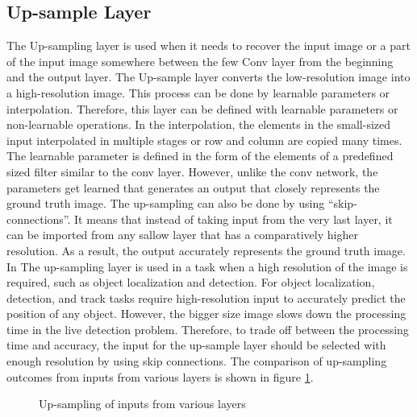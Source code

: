 \subsection{Up-sample Layer}
The Up-sampling layer is used when it needs to recover the input image or a part of the input image somewhere between the few Conv layer from the beginning and the output layer. The Up-sample layer converts the low-resolution image into a high-resolution image. This process can be done by learnable parameters or interpolation. Therefore, this layer can be defined with learnable parameters or non-learnable operations. In the interpolation, the elements in the small-sized input interpolated in multiple stages or row and column are copied many times. The learnable parameter is defined in the form of the elements of a predefined sized filter similar to the conv layer. However, unlike the conv network, the parameters get learned that generates an output that closely represents the ground truth image. The up-sampling can also be done by using “skip-connections”. It means that instead of taking input from the very last layer, it can be imported from any sallow layer that has a comparatively higher resolution. As a result,  the output accurately represents the ground truth image. 
In
The up-sampling layer is used in a task when a high resolution of the image is required, such as object localization and detection. For object localization, detection, and track tasks require high-resolution input to accurately predict the position of any object. However, the bigger size image slows down the processing time in the live detection problem. Therefore, to trade off between the processing time and accuracy, the input for the up-sample layer should be selected with enough resolution by using skip connections. The comparison of up-sampling outcomes from inputs from various layers is shown in figure \ref{upsample}.

\begin{figure}
    \centering
    \caption{Up-sampling of inputs from various layers \cite{coursera1}}
    \label{upsample}
\end{figure}

